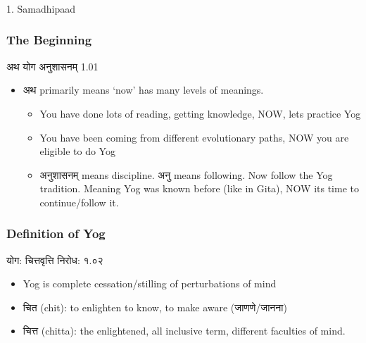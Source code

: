 \begin{frame}[fragile]\frametitle{}
\begin{center}
{\Large 1. Samadhipaad}
\end{center}
\end{frame}


\begin{frame}[fragile]\frametitle{The Beginning}

अथ योग अनुशासनम् 1.01

	\begin{itemize}
	\item अथ primarily means `now' has many levels of meanings.
	\begin{itemize}
	\item You have done lots of reading, getting knowledge, NOW, lets practice Yog
	\item You have been coming from different evolutionary paths, NOW you are eligible to do Yog
	\item अनुशासनम् means discipline. अनु means following. Now follow the Yog tradition. Meaning Yog was known before (like in Gita), NOW its time to continue/follow it.
	\end{itemize}	
	\end{itemize}

\end{frame}


\begin{frame}[fragile]\frametitle{Definition of Yog}

योग: चित्तवृत्ति निरोध: १.०२

	\begin{itemize}
	\item Yog is complete cessation/stilling of perturbations of mind
	\item चित (chit): to enlighten to know, to make aware (जाणणे/जानना)
	\item चित्त (chitta): the enlightened, all inclusive term, different faculties of mind.
	\end{itemize}

\end{frame}


